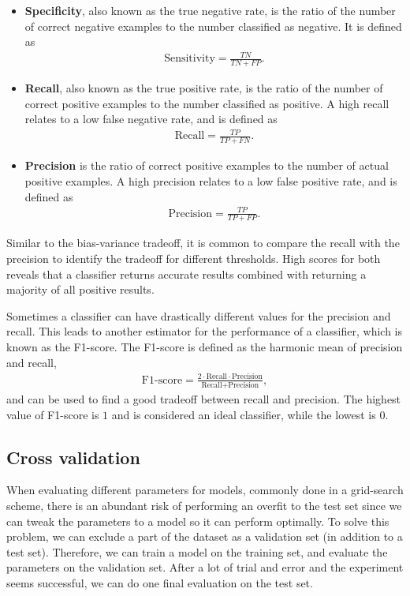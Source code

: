 \begin{itemize}

\item \textbf{Specificity}, also known as the true negative rate, is the ratio of the number of correct negative examples to the number classified as negative. It is defined as
\begin{align}
\text{Sensitivity} = \frac{TN}{TN + FP}.
\end{align}

\item \textbf{Recall}, also known as the true positive rate, is the ratio of the number of correct positive examples to the number classified as positive. A high recall relates to a low false negative rate, and is defined as
\begin{align}
\text{Recall} = \frac{TP}{TP + FN}.
\end{align}

\item \textbf{Precision} is the ratio of correct positive examples to the number of actual positive examples. A high precision relates to a low false positive rate, and is defined as  \\
\begin{align}
\text{Precision} = \frac{TP}{TP + FP}.
\end{align}
\end{itemize} Similar to the bias-variance tradeoff, it is common to compare the recall with the precision to identify the tradeoff for different thresholds. High scores for both reveals that a classifier returns accurate results combined with returning a majority of all positive results.

Sometimes a classifier can have drastically different values for the precision and recall. This leads to another estimator for the performance of a classifier, which is known as the F1-score. The F1-score is defined as the harmonic mean of precision and recall,
\begin{align*}
\text{F1-score} = \frac{2\cdot \text{Recall} \cdot \text{Precision}}{\text{Recall} + \text{Precision}},
\end{align*}
and can be used to find a good tradeoff between recall and precision. The highest value of F1-score is $1$ and is considered an ideal classifier, while the lowest is $0$.

\subsection{Cross validation}
\label{cross-validation}
When evaluating different parameters for models, commonly done in a grid-search scheme, there is an abundant risk of performing an overfit to the test set since we can tweak the parameters to a model so it can perform optimally. To solve this problem, we can exclude a part of the dataset as a validation set (in addition to a test set). Therefore, we can train a model on the training set, and evaluate the parameters on the validation set. After a lot of trial and error and the experiment seems successful, we can do one final evaluation on the test set.

